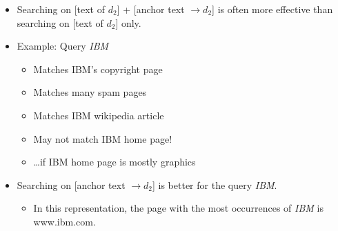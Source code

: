 \documentclass[a4paper,landscape,headrule,footrule,xetex]{foils}
\begin{document}

\begin{itemize}
\item  Searching on [text of $d_2$] +
    [anchor text $\rightarrow d_2$] is often more effective than
  searching on [text of $d_2$] only.
\item Example: Query \emph{IBM}
\begin{itemize}
\item Matches IBM's copyright page
\item Matches many spam pages
\item Matches IBM wikipedia article
\item May not match IBM home page!
\item  \ldots if IBM home page is mostly graphics
\end{itemize}
\item Searching on [anchor text $\rightarrow d_2$] is better for the query \emph{IBM}.
\begin{itemize}
\item In this representation, the page with the most
  occurrences of \emph{IBM} is www.ibm.com.
\end{itemize}
\end{itemize}







\end{document}
